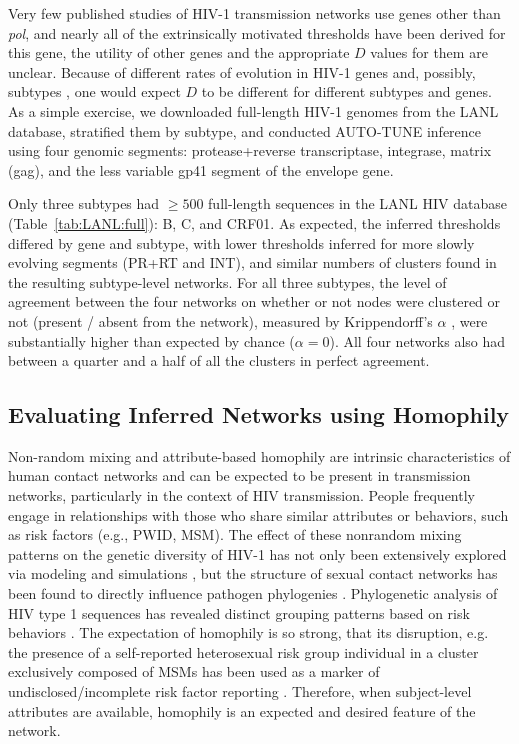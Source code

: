 \documentclass[utf8]{FrontiersinHarvard} %
\newcommand{\TODO}[1]{{\color{red}{#1}}}
\begin{document}
Very few published studies of HIV-1 transmission networks use genes other than
	{\it pol}, and nearly all of the extrinsically motivated thresholds have been
derived for this gene, the utility of other genes and the appropriate $D$
values for them are unclear. Because of different rates of evolution in HIV-1
genes and, possibly, subtypes \cite{Penn:2008aa}, one would expect $D$ to be
different for different subtypes and genes. As a simple exercise, we downloaded
full-length HIV-1 genomes from the LANL database, stratified them by subtype,
and conducted AUTO-TUNE inference using four genomic segments: protease+reverse
transcriptase, integrase, matrix (gag), and the less variable gp41 segment of
the envelope gene.

Only three subtypes had $\geq 500$ full-length sequences in the LANL HIV
database (Table~\ref{tab:LANL:full}): B, C, and CRF01. As expected, the
inferred thresholds differed by gene and subtype, with lower thresholds
inferred for more slowly evolving segments (PR+RT and INT), and similar numbers
of clusters found in the resulting subtype-level networks. For all three
subtypes, the level of agreement between the four networks on whether or not
nodes were clustered or not (present / absent from the network), measured by
Krippendorff's $\alpha$ \cite{doi:10.1080/19312450709336664}, were
substantially higher than expected by chance ($\alpha = 0$). All four networks
also had between a quarter and a half of all the clusters in perfect agreement. 

\subsection{Evaluating Inferred Networks using Homophily}

\TODO{JOW : The strongest predictor of homophily in HIV networks is actually race/ethnicity, not transmission risk: https://pubmed.ncbi.nlm.nih.gov/33349132/}

Non-random mixing and attribute-based homophily are intrinsic characteristics
of human contact networks and can be expected to be present in transmission
networks, particularly in the context of HIV transmission. People frequently
engage in relationships with those who share similar attributes or behaviors,
such as risk factors (e.g., PWID, MSM). The effect of these nonrandom mixing
patterns on the genetic diversity of HIV-1 has not only been extensively
explored via modeling and simulations \citep{goodreau_assessing_2006}, but the
structure of sexual contact networks has been found to directly influence
pathogen phylogenies \citep{robinson_how_2013}. Phylogenetic analysis of HIV
type 1 sequences has revealed distinct grouping patterns based on risk
behaviors \citep{holmes_molecular_1995}. The expectation of homophily is so
strong, that its disruption, e.g. the presence of a self-reported heterosexual
risk group individual in a cluster exclusively composed of MSMs has been used
as a marker of undisclosed/incomplete risk factor reporting
\cite{Ragonnet-Cronin:2018aa}. Therefore, when subject-level attributes are
available, homophily is an expected and desired feature of the network.
\end{document}

